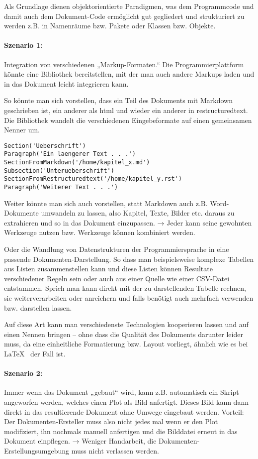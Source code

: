 Als Grundlage dienen objektorientierte Paradigmen, was dem Programmcode
und damit auch dem Dokument-Code ermöglicht gut gegliedert und strukturiert
zu werden z.B. in Namenräume bzw. Pakete oder Klassen bzw. Objekte.

\paragraph{Szenario 1:} Integration von verschiedenen „Markup-Formaten.“
Die Programmierplattform könnte eine Bibliothek bereitstellen, mit der
man auch andere Markups laden und in das Dokument leicht integrieren
kann.

So könnte man sich vorstellen, dass ein Teil des Dokuments mit Markdown
geschrieben ist, ein anderer als html und wieder ein anderer in
restructuredtext. Die Bibliothek wandelt die verschiedenen Eingebeformate
auf einen gemeinsamen Nenner um.

\begin{verbatim}
Section('Ueberschrift')
Paragraph('Ein laengerer Text . . .')
SectionFromMarkdown('/home/kapitel_x.md')
Subsection('Unterueberschrift')
SectionFromRestructuredtext('/home/kapitel_y.rst')
Paragraph('Weiterer Text . . .')
\end{verbatim}

Weiter könnte man sich auch vorstellen, statt Markdown auch z.B. Word-Dokumente
umwandeln zu lassen, also Kapitel, Texte, Bilder etc. daraus zu extrahieren und
so in das Dokument einzupassen.
→ Jeder kann seine gewohnten Werkzeuge nutzen bzw.
Werkzeuge können kombiniert werden.

Oder die Wandlung von Datenstrukturen der Programmiersprache in eine passende
Dokumenten-Darstellung. So dass man beispielsweise komplexe Tabellen aus
Listen zusammenstellen kann und diese Listen können Resultate
verschiedener Regeln sein oder auch aus einer Quelle wie einer CSV-Datei
entstammen. Sprich man kann direkt mit der zu darstellenden Tabelle
rechnen, sie weiterverarbeiten oder anreichern und falls benötigt auch
mehrfach verwenden bzw. darstellen lassen.

Auf diese Art kann man verschiedenste Technologien kooperieren lassen und
auf einen Nennen bringen -- ohne dass die Qualität des Dokuments darunter
leider muss, da eine einheitliche Formatierung bzw. Layout vorliegt,
ähnlich wie es bei \LaTeX~ der Fall ist.

\paragraph{Szenario 2:} Immer wenn das Dokument „gebaut“ wird, kann z.B.
automatisch ein Skript angeworfen werden, welches einen Plot als Bild
anfertigt. Dieses Bild kann dann direkt in das resultierende Dokument ohne
Umwege eingebaut werden. Vorteil: Der Dokumenten-Ersteller muss also nicht jedes
mal wenn er den Plot modifiziert, ihn nochmals manuell anfertigen und
die Bilddatei erneut in das Dokument einpflegen. → Weniger Handarbeit,
die Dokumenten-Erstellungsumgebung muss nicht verlassen werden.

